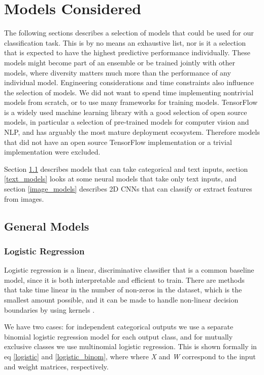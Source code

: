 \section{Models Considered}
\label{models_considered}

The following sections describes a selection of models that could be used for our classification task.
This is by no means an exhaustive list, nor is it a selection that is expected to have the highest predictive performance individually.
These models might become part of an ensemble or be trained jointly with other models, where diversity matters much more than the performance of any individual model.
Engineering  considerations and time constraints also influence the selection of models.
We did not want to spend time implementing nontrivial models from scratch, or to use many frameworks for training models.
TensorFlow  is a widely used machine learning library with a good selection of open source models, in particular a selection of pre-trained models for computer vision and NLP, and has arguably the most mature deployment ecosystem.
Therefore models that did not have an open source TensorFlow implementation or a trivial implementation were excluded.

Section \ref{general_models} describes models that can take categorical and text inputs, section \ref{text_models} looks at some neural models that take only text inputs, and section \ref{image_models} describes 2D CNNs that can classify or extract features from images.

\subsection{General Models}
\label{general_models}



\subsubsection{Logistic Regression}

Logistic regression is a linear, discriminative classifier that is a common baseline model, since it is both interpretable and efficient to train.
There are methods that take time linear in the number of non-zeros in the dataset, which is the smallest amount possible, and it can be made to handle non-linear decision boundaries by using kernels \cite{murphy}.

We have two cases: for independent categorical outputs we use a separate binomial logistic regression model for each output class, and for mutually exclusive classes we use multinomial logistic regression.
This is shown formally in eq  \ref{logistic} and \ref{logistic_binom}, where where \textit{X} and \textit{W} correspond to the input and weight matrices, respectively.

